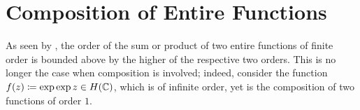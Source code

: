 \chapter{Composition of Entire Functions}
\label{ch:composition-entire-functions}

As seen by , the order of the sum or product of two entire functions of finite order is bounded above by the higher of the respective two orders. This is no longer the case when composition is involved; indeed, consider the function $f(z) \coloneqq \exp \exp z \in H(\mathbb{C})$, which is of infinite order, yet is the composition of two functions of order $1$. 

